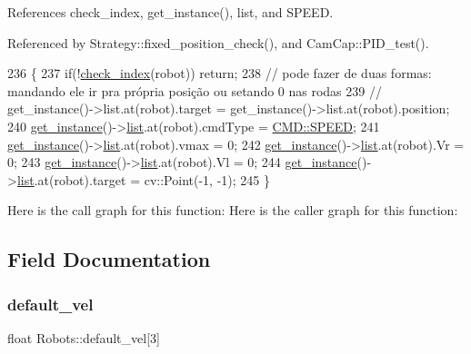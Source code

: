 References check\+\_\+index, get\+\_\+instance(), list, and S\+P\+E\+ED.



Referenced by Strategy\+::fixed\+\_\+position\+\_\+check(), and Cam\+Cap\+::\+P\+I\+D\+\_\+test().


\begin{DoxyCode}
236                            \{
237     \textcolor{keywordflow}{if}(!\hyperlink{robots_8hpp_ae3e6ae8f87cdc750c0b99bc609d9ae43}{check\_index}(robot)) \textcolor{keywordflow}{return};
238     \textcolor{comment}{// pode fazer de duas formas: mandando ele ir pra própria posição ou setando 0 nas rodas}
239     \textcolor{comment}{// get\_instance()->list.at(robot).target = get\_instance()->list.at(robot).position;}
240     \hyperlink{class_robots_a589bce74db5f34af384952d48435168f}{get\_instance}()->\hyperlink{class_robots_a2c6b77265028f82a4342ca1ef15ed305}{list}.at(robot).cmdType = \hyperlink{serial_w_8hpp_aac3553b3932cbfeeac4526ce7ca0336b}{CMD::SPEED};
241     \hyperlink{class_robots_a589bce74db5f34af384952d48435168f}{get\_instance}()->\hyperlink{class_robots_a2c6b77265028f82a4342ca1ef15ed305}{list}.at(robot).vmax = 0;
242     \hyperlink{class_robots_a589bce74db5f34af384952d48435168f}{get\_instance}()->\hyperlink{class_robots_a2c6b77265028f82a4342ca1ef15ed305}{list}.at(robot).Vr = 0;
243     \hyperlink{class_robots_a589bce74db5f34af384952d48435168f}{get\_instance}()->\hyperlink{class_robots_a2c6b77265028f82a4342ca1ef15ed305}{list}.at(robot).Vl = 0;
244     \hyperlink{class_robots_a589bce74db5f34af384952d48435168f}{get\_instance}()->\hyperlink{class_robots_a2c6b77265028f82a4342ca1ef15ed305}{list}.at(robot).target = cv::Point(-1, -1);
245 \}
\end{DoxyCode}
Here is the call graph for this function\+:
Here is the caller graph for this function\+:


\subsection{Field Documentation}
\mbox{\label{class_robots_a6c03d49137645a67d5c5e39bb953a788}} 
\subsubsection{\texorpdfstring{default\+\_\+vel}{default\_vel}}
{\footnotesize\ttfamily float Robots\+::default\+\_\+vel\mbox{[}3\mbox{]}\hspace{0.3cm}{\ttfamily [private]}}



